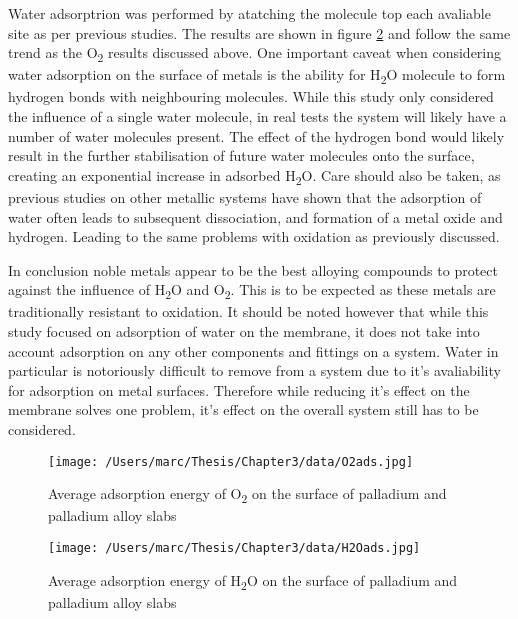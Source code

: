 Water adsorptrion was performed by atatching the molecule top each avaliable site as per previous studies. \cite{Roques2009} The results are shown in figure \ref{H2Oads} and follow the same trend as the O\textsubscript{2} results discussed above. One important caveat when considering water adsorption on the surface of metals is the ability for H\textsubscript{2}O molecule to form hydrogen bonds with neighbouring molecules.\cite{PhysRevB.69.195404} While this study only considered the influence of a single water molecule, in real tests the system will likely have a number of water molecules present. The effect of the hydrogen bond would likely result in the further stabilisation of future water molecules onto the surface, creating an exponential increase in adsorbed H\textsubscript{2}O. \cite{PhysRevB.69.195404} Care should also be taken, as previous studies on other metallic systems have shown that the adsorption of water often leads to subsequent dissociation, and formation of a metal oxide and hydrogen. Leading to the same problems with oxidation as previously discussed. \cite{doi:10.1021/jz300994e}

In conclusion noble metals appear to be the best alloying compounds to protect against the influence of H\textsubscript{2}O and O\textsubscript{2}. This is to be expected as these metals are traditionally resistant to oxidation. It should be noted however that while this study focused on adsorption of water on the membrane, it does not take into account adsorption on any other components and fittings on a system. Water in particular is notoriously difficult to remove from a system due to it's avaliability for adsorption on metal surfaces.\cite{BACQUART20205565} Therefore while reducing it's effect on the membrane solves one problem, it's effect on the overall system still has to be considered. 

\begin{landscape}
  \begin{figure}
      \centering
      \texttt{[image: /Users/marc/Thesis/Chapter3/data/O2ads.jpg]}
      \caption{Average adsorption energy of O\textsubscript{2} on the surface of palladium and palladium alloy slabs}
      \label{O2ads}
    \end{figure}
  
  \end{landscape}


\begin{landscape}
  \begin{figure}
      \centering
      \texttt{[image: /Users/marc/Thesis/Chapter3/data/H2Oads.jpg]}
      \caption{Average adsorption energy of H\textsubscript{2}O on the surface of palladium and palladium alloy slabs}
      \label{H2Oads}
    \end{figure}
  
  \end{landscape}

